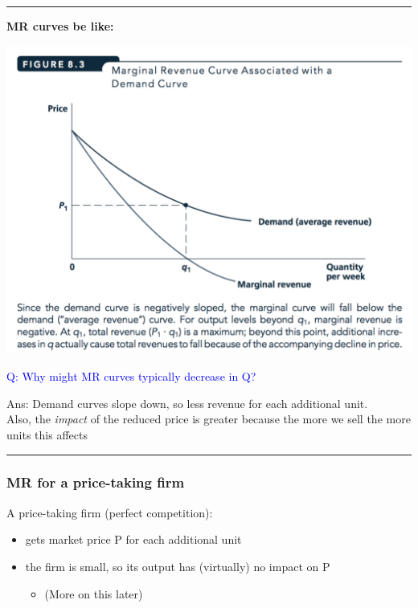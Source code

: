 \documentclass[]{article}
\providecommand{\tightlist}{%
  \setlength{\itemsep}{0pt}\setlength{\parskip}{0pt}}
\begin{document}
\begin{center}\rule{0.5\linewidth}{\linethickness}\end{center}

\textbf{MR curves be like:}

\includegraphics[height=4in]{picsfigs/mrcurve.png}

\textcolor{blue}{Q: Why might MR curves typically decrease in Q?}

Ans: Demand curves slope down, so less revenue for each additional
unit.\\
Also, the \emph{impact} of the reduced price is greater because the more
we sell the more units this affects

\begin{center}\rule{0.5\linewidth}{\linethickness}\end{center}

\hypertarget{mr-for-a-price-taking-firm}{%
\subsubsection{MR for a price-taking
firm}\label{mr-for-a-price-taking-firm}}

A price-taking firm (perfect competition):

\begin{itemize}
\tightlist
\item
  gets market price P for each additional unit
\item
  the firm is small, so its output has (virtually) no impact on P

  \begin{itemize}
  \tightlist
  \item
    (More on this later)
  \end{itemize}
\end{itemize}
\end{document}
